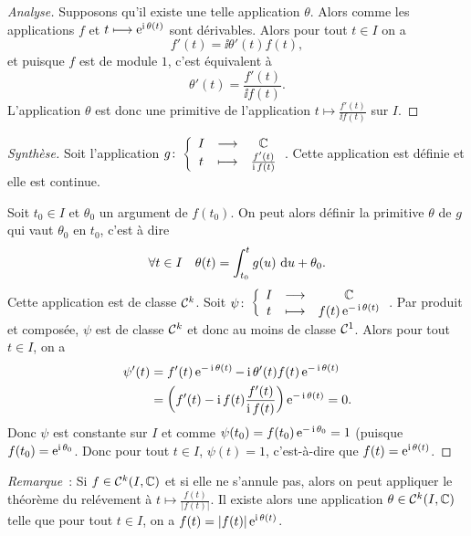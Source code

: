 \begin{proof}[Analyse]
  Supposons qu'il existe une telle application \(\theta\). Alors comme les applications \(f\) et \(t \longmapsto \operatorname{e}^{\operatorname{i}\theta(t)}\) sont dérivables. Alors pour tout \(t\in I\) on a
  \begin{equation}
    f'(t) = \ii \theta'(t)f(t),
  \end{equation}
  et puisque \(f\) est de module \(1\), c'est équivalent à
  \begin{equation}
    \theta'(t) = \frac{f'(t)}{\ii f(t)}.
  \end{equation}
  L'application \(\theta\) est donc une primitive de l'application \(t \longmapsto \frac{f'(t)}{\ii f(t)}\) sur \(I\). 
\end{proof}
\begin{proof}[Synthèse]
  Soit l'application \(g\colon \left\{\begin{array}{ccc} I & \longrightarrow &\mathbb{C}\\ t & \longmapsto & \frac{f'(t)}{\operatorname{i} f(t)} \end{array} \right.\). Cette application est définie et elle est continue.

  Soit \(t_0 \in I\) et \(\theta_0\) un argument de \(f(t_0)\). On peut alors définir la primitive \(\theta\) de \(g\) qui vaut \(\theta_0\) en \(t_0\), c'est à dire
  \begin{equation}
    \forall t \in I \quad \theta(t) = \int_{t_0}^t g(u)\,\mathop{}\mathopen{}\mathrm{d} u +\theta_0.
  \end{equation}
  Cette application est de classe \(\mathcal{C}^{k}\). Soit \(\psi\colon \left\{\begin{array}{ccc} I & \longrightarrow &\mathbb{C}\\ t & \longmapsto & f(t)\operatorname{e}^{-\operatorname{i}\theta(t)} \end{array} \right.\). Par produit et composée, \(\psi\) est de classe \(\mathcal{C}^{k}\) et donc au moins de classe \(\mathcal{C}^{1}\). Alors pour tout \(t \in I\), on a
    \begin{align}
      \psi'(t) &= f'(t)\operatorname{e}^{-\operatorname{i} \theta(t)}-\operatorname{i} \theta'(t)f(t) \operatorname{e}^{-\operatorname{i}\theta(t)} \\
      &=\left(f'(t)-\operatorname{i} f(t) \frac{f'(t)}{\operatorname{i} f(t)} \right)\operatorname{e}^{-\operatorname{i} \theta(t)} =0.
    \end{align}
    Donc \(\psi\) est constante sur \(I\) et comme \(\psi(t_0)=f(t_0)\operatorname{e}^{-\operatorname{i} \theta_0}=1\) (puisque \(f(t_0)=\operatorname{e}^{\operatorname{i} \theta_0}\). Donc pour tout \(t \in I\), \(\psi(t)=1\), c'est-à-dire que \(f(t)=\operatorname{e}^{\operatorname{i} \theta(t)}\).
\end{proof}

\emph{Remarque}~: Si \(f \in \mathcal{C}^{k}(I,\mathbb{C})\) et si elle ne s'annule pas, alors on peut appliquer le théorème du relévement à \(t \longmapsto \frac{f(t)}{|f(t)|}\). Il existe alors une application \(\theta \in \mathcal{C}^{k}(I,\mathbb{C})\) telle que pour tout \(t \in I\), on a \(f(t) = |f(t)|\operatorname{e}^{\operatorname{i} \theta(t)}\).

